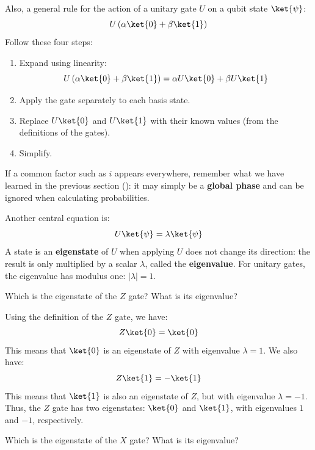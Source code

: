 Also, a general rule for the action of a unitary gate $U$ on a qubit state $\ket{\psi}$:
\begin{equation*}
    U\left(\alpha \ket{0} + \beta\ket{1}\right)
\end{equation*}
Follow these four steps:
\begin{enumerate}
    \item Expand using linearity:
    \begin{equation*}
        U\left(\alpha \ket{0} + \beta\ket{1}\right) = \alpha U\ket{0} + \beta U\ket{1}
    \end{equation*}
    \item Apply the gate separately to each basis state.
    \item Replace $U\ket{0}$ and $U\ket{1}$ with their known values (from the definitions of the gates).
    \item Simplify.
\end{enumerate}
If a common factor such as $i$ appears everywhere, remember what we have learned in the previous section (): it may simply be a \textbf{global phase} and can be ignored when calculating probabilities.

\highspace
Another central equation is:
\begin{equation*}
    U\ket{\psi} = \lambda \ket{\psi}
\end{equation*}
A state \ket{\psi} is an \textbf{eigenstate} of $U$ when applying $U$ does not change its direction: the result is only multiplied by a scalar $\lambda$, called the \textbf{eigenvalue}. For unitary gates, the eigenvalue has modulus one: $\left|\lambda\right| = 1$.

\highspace
\exercise Which is the eigenstate of the $Z$ gate? What is its eigenvalue?

\highspace
\solution Using the definition of the $Z$ gate, we have:
\begin{equation*}
    Z\ket{0} = \ket{0}
\end{equation*}
This means that $\ket{0}$ is an eigenstate of $Z$ with eigenvalue $\lambda = 1$. We also have:
\begin{equation*}
    Z\ket{1} = -\ket{1}
\end{equation*}
This means that $\ket{1}$ is also an eigenstate of $Z$, but with eigenvalue $\lambda = -1$. Thus, the $Z$ gate has two eigenstates: $\ket{0}$ and $\ket{1}$, with eigenvalues $1$ and $-1$, respectively.

\highspace
\exercise Which is the eigenstate of the $X$ gate? What is its eigenvalue?

